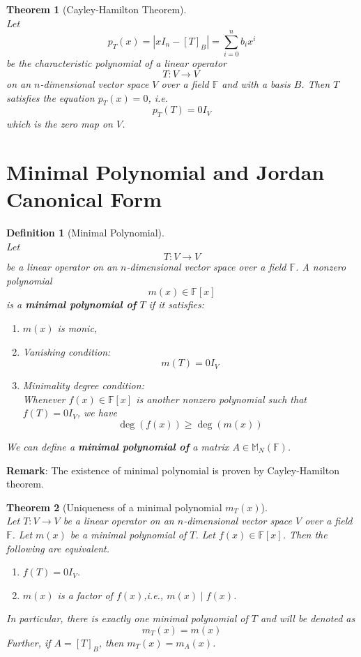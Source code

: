 \documentclass[12pt]{article}
\newtheorem{definition}{Definition}[section]
\newtheorem{theorem}{Theorem}[section]
\theoremstyle{definition}
\begin{document}
\begin{theorem}[Cayley-Hamilton Theorem]
\hfill\\\normalfont
Let
\[
p_T(x)=|xI_n-[T]_B|=\sum_{i=0}^n b_ix^i
\]
be the characteristic polynomial of a linear operator
\[
T:V\to V\
\]
on an $n$-dimensional vector space $V$ over a field $\mathbb{F}$ and with a basis $B$. Then $T$ satisfies the equation $p_T(x)=0$, i.e.
\[
p_T(T)=0I_V
\]
which is the zero map on $V$.
\end{theorem}
\clearpage
\section{Minimal Polynomial and Jordan Canonical Form}
\begin{definition}[Minimal Polynomial]
\hfill\\\normalfont Let
\[
T:V\to V
\]
be a linear operator on an $n$-dimensional vector space over a field $\mathbb{F}$. A nonzero polynomial
\[
m(x)\in\mathbb{F}[x]
\]
is a \textbf{minimal polynomial of} $T$ if it satisfies:
\begin{enumerate}
\item $m(x)$ is monic,
\item Vanishing condition:
\[
m(T)=0I_V
\]
\item Minimality degree condition:\\Whenever $f(x)\in\mathbb{F}[x]$ is another nonzero polynomial such that $f(T)=0I_V$, we have
\[
\deg(f(x))\geq \deg(m(x))
\]
\end{enumerate}
We can define a \textbf{minimal polynomial of} a matrix $A\in\mathbb{M}_N(\mathbb{F})$.
\end{definition}
\textbf{Remark}: The existence of minimal polynomial is proven by Cayley-Hamilton theorem.
\begin{theorem}[Uniqueness of a minimal polynomial $m_T(x)$]
\hfill\\\normalfont Let $T:V\to V$ be a linear operator on an $n$-dimensional vector space $V$ over a field $\mathbb{F}$. Let $m(x)$ be a minimal polynomial of $T$. Let $f(x)\in\mathbb{F}[x]$. Then the following are equivalent.
\begin{enumerate}[label = (\arabic*)]
\item $f(T)=0I_V$.
\item $m(x)$ is a factor of $f(x)$,i.e., $m(x)\mid f(x)$.
\end{enumerate}
In particular, there is exactly one minimal polynomial of $T$ and will be denoted as
\[
m_T(x)=m(x)
\]
Further, if $A=[T]_B$, then $m_T(x)=m_A(x)$.
\end{theorem}
\end{document}
